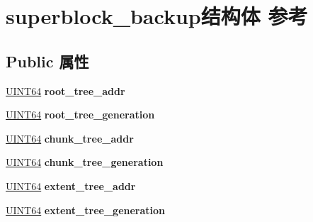 \hypertarget{structsuperblock__backup}{}\section{superblock\+\_\+backup结构体 参考}
\label{structsuperblock__backup}
\subsection*{Public 属性}
\begin{DoxyCompactItemize}
\item 
\mbox{\label{structsuperblock__backup_a4c9ee32b861474e6853d0f0703669d77}} 
\hyperlink{_processor_bind_8h_a57be03562867144161c1bfee95ca8f7c}{U\+I\+N\+T64} {\bfseries root\+\_\+tree\+\_\+addr}
\item 
\mbox{\label{structsuperblock__backup_afc490e9d1bcd586b028c2c212db6ed14}} 
\hyperlink{_processor_bind_8h_a57be03562867144161c1bfee95ca8f7c}{U\+I\+N\+T64} {\bfseries root\+\_\+tree\+\_\+generation}
\item 
\mbox{\label{structsuperblock__backup_ab530b2c057fec575cd7b4e87d59856d6}} 
\hyperlink{_processor_bind_8h_a57be03562867144161c1bfee95ca8f7c}{U\+I\+N\+T64} {\bfseries chunk\+\_\+tree\+\_\+addr}
\item 
\mbox{\label{structsuperblock__backup_a1b65c23e192985ebd6e312d360b375f6}} 
\hyperlink{_processor_bind_8h_a57be03562867144161c1bfee95ca8f7c}{U\+I\+N\+T64} {\bfseries chunk\+\_\+tree\+\_\+generation}
\item 
\mbox{\label{structsuperblock__backup_a6c29115cc10d45507a48f61a14ad4adb}} 
\hyperlink{_processor_bind_8h_a57be03562867144161c1bfee95ca8f7c}{U\+I\+N\+T64} {\bfseries extent\+\_\+tree\+\_\+addr}
\item 
\mbox{\label{structsuperblock__backup_a45041268fb657bf72aa10d07eb9f0a2f}} 
\hyperlink{_processor_bind_8h_a57be03562867144161c1bfee95ca8f7c}{U\+I\+N\+T64} {\bfseries extent\+\_\+tree\+\_\+generation}
\item 
\mbox{\label{structsuperblock__backup_a21dc2ac8ae572388d44e0468e8e40e98}} 

\end{DoxyCompactItemize}
